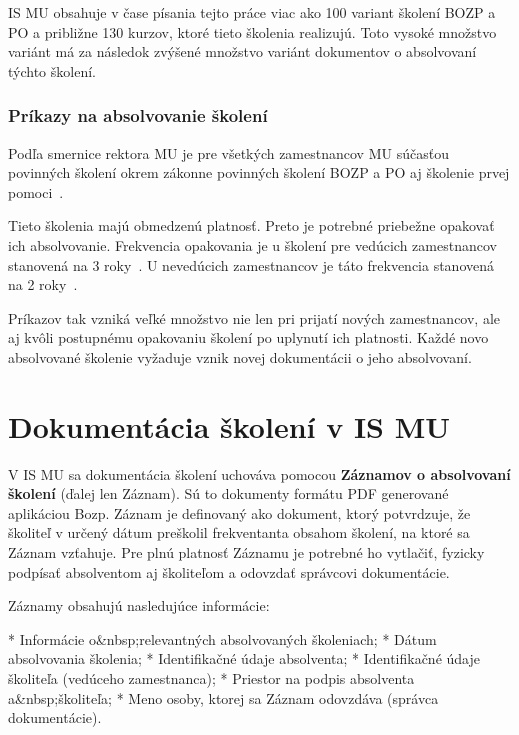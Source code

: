 \documentclass[
  digital,     %
  oneside,     %
  nosansbold,  %
  nocolorbold, %
  lof,         %
  nolot,         %
]{fithesis4}
\begin{document}
IS MU obsahuje v čase písania tejto práce viac ako 100 variant školení BOZP a PO a približne 130 kurzov, ktoré tieto školenia realizujú. Toto vysoké množstvo variánt má za následok zvýšené množstvo variánt dokumentov o absolvovaní týchto školení.

\subsection*{Príkazy na absolvovanie školení}
Podľa smernice rektora MU je pre všetkých zamestnancov MU súčasťou povinných školení okrem zákonne povinných školení BOZP a PO aj školenie prvej pomoci~\cites[sekcia~3.2.1,~bod~3.]{smernice_rektora_bozp}.

Tieto školenia majú obmedzenú platnosť. Preto je potrebné priebežne opakovať ich absolvovanie. Frekvencia opakovania je u školení pre vedúcich zamestnancov stanovená na 3 roky~\cites[sekcia~3.2.4,~bod~b)]{smernice_rektora_bozp}[čl.~4,~odst.~2~bod~c)]{smernice_mu_po}. U nevedúcich zamestnancov je táto frekvencia stanovená na 2 roky~\cites[sekcia~3.2.2,~bod~1.]{smernice_rektora_bozp}[čl.~10,~odst.~2]{smernice_mu_po}.

Príkazov tak vzniká veľké množstvo nie len pri prijatí nových zamestnancov, ale aj kvôli postupnému opakovaniu školení po uplynutí ich platnosti. Každé novo absolvované školenie vyžaduje vznik novej dokumentácii o jeho absolvovaní.

\chapter{Dokumentácia školení v IS MU}
\label{kap-3}
V IS MU sa dokumentácia školení uchováva pomocou \textbf{Záznamov o absolvovaní školení} (ďalej len Záznam). Sú to dokumenty formátu PDF generované aplikáciou Bozp. Záznam je definovaný ako dokument, ktorý potvrdzuje, že školiteľ v určený dátum preškolil frekventanta obsahom školení, na ktoré sa Záznam vzťahuje. Pre plnú platnosť Záznamu je potrebné ho vytlačiť, fyzicky podpísať absolventom aj školiteľom a odovzdať správcovi dokumentácie.

Záznamy obsahujú nasledujúce informácie:

\begin{markdown}
  * Informácie o&nbsp;relevantných absolvovaných školeniach;
  * Dátum absolvovania školenia;
  * Identifikačné údaje absolventa;
  * Identifikačné údaje školiteľa (vedúceho zamestnanca);
  * Priestor na podpis absolventa a&nbsp;školiteľa;
  * Meno osoby, ktorej sa Záznam odovzdáva (správca dokumentácie).
\end{markdown}
\end{document}
